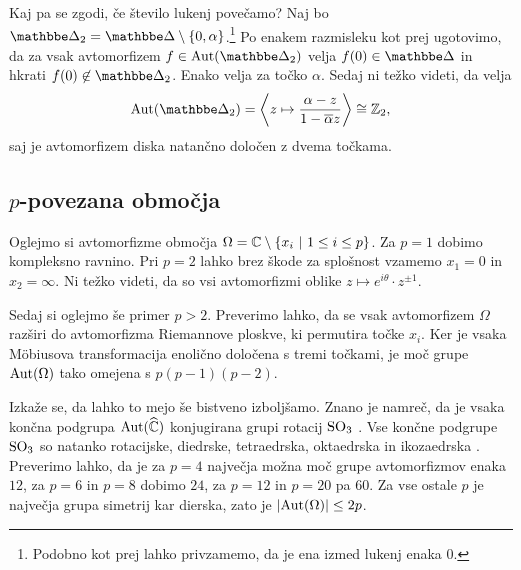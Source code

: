 Kaj pa se zgodi, če število lukenj povečamo? Naj bo
$\dsk_2 = \dsk \setminus \set{0, \alpha}$.\footnote{Podobno kot
prej lahko privzamemo, da je ena izmed lukenj enaka $0$.} Po
enakem razmisleku kot prej ugotovimo, da za vsak avtomorfizem
$f \in \Aut(\dsk_2)$ velja $f(0) \in \dsk$ in hkrati
$f(0) \not \in \dsk_2$. Enako velja za točko $\alpha$. Sedaj ni
težko videti, da velja
\[
\Aut(\dsk_2) =
\skl{z \mapsto \frac{\alpha - z}{1 - \oline{\alpha} z}} \cong
\Z_2,
\]
saj je avtomorfizem diska natančno določen z dvema točkama.


\subsection{\texorpdfstring{$p$}{p}-povezana območja}

Oglejmo si avtomorfizme območja
$\Omega = \mathbb{C} \setminus \left\{x_i~\middle\vert~1 \leq i \leq p\right\}$. Za $p = 1$
dobimo kompleksno ravnino. Pri $p = 2$ lahko brez škode za
splošnost vzamemo $x_1 = 0$ in $x_2 = \infty$. Ni težko videti, da
so vsi avtomorfizmi oblike
$z \mapsto e^{i \theta} \cdot z^{\pm 1}$.

Sedaj si oglejmo še primer $p > 2$. Preverimo lahko, da se vsak
avtomorfizem $\Omega$ razširi do avtomorfizma Riemannove ploskve,
ki permutira točke $x_i$. Ker je vsaka Möbiusova transformacija
enolično določena s tremi točkami, je moč grupe $\operatorname{Aut}(\Omega)$ tako
omejena s $p (p-1) (p-2)$.

Izkaže se, da lahko to mejo še bistveno izboljšamo. Znano je
namreč, da je vsaka končna podgrupa $\operatorname{Aut}(\widehat{\mathbb{C}})$ konjugirana grupi
rotacij $\operatorname{SO}_3$ \cite{Lyndol}. Vse končne podgrupe $\operatorname{SO}_3$ so
natanko rotacijske, diedrske, tetraedrska, oktaedrska in
ikozaedrska \cite{Artin_1991}. Preverimo lahko, da je za $p = 4$
največja možna moč grupe avtomorfizmov enaka $12$, za $p = 6$ in
$p = 8$ dobimo $24$, za $p = 12$ in $p = 20$ pa $60$. Za vse ostale
$p$ je največja grupa simetrij kar dierska, zato je
$\left\lvert \operatorname{Aut}(\Omega)\right\rvert \leq 2p$.

